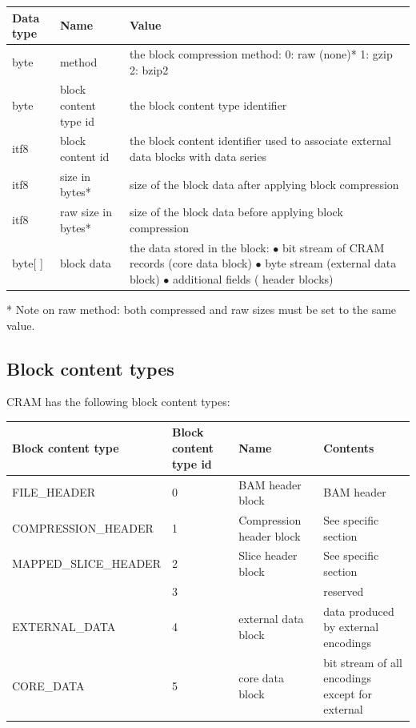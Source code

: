 \documentclass[a4paper]{article}
\begin{document}
\begin{tabular}{|l|>{\raggedright}p{120pt}|>{\raggedright}p{260pt}|}
\hline
\textbf{Data type} & \textbf{Name} & \textbf{Value}
\tabularnewline
\hline
byte & method & the block compression method: \linebreak{}
0: raw (none)*\linebreak{}
1: gzip\linebreak{}
2: bzip2\tabularnewline
\hline
byte & block content type id & the block content type identifier\tabularnewline
\hline
itf8 & block content id & the block content identifier used to associate external 
data blocks with data series\tabularnewline
\hline
itf8 & size in bytes* & size of the block data after applying block compression\tabularnewline
\hline
itf8 & raw size in bytes* & size of the block data before applying block compression\tabularnewline
\hline
byte[ ] & block data & the data stored in the block:\linebreak{}
$\bullet$ bit stream of CRAM records (core data block)\linebreak{}
$\bullet$ byte stream (external data block)\linebreak{}
$\bullet$ additional fields ( header blocks)\tabularnewline
\hline
\end{tabular}

* Note on raw method: both compressed and raw sizes must be set to the same value.

\subsection{\textbf{Block content types}}

CRAM has the following block content types:

\begin{tabular}{|>{\raggedright}p{143pt}|>{\raggedright}p{45pt}|>{\raggedright}p{116pt}|>{\raggedright}p{114pt}|}
\hline
\textbf{Block content type} & \textbf{Block content type id} & \textbf{Name} & \textbf{Contents}\tabularnewline
\hline
FILE\_HEADER & 0 & BAM header block & BAM header\tabularnewline
\hline
COMPRESSION\_HEADER & 1 & Compression header block & See specific section\tabularnewline
\hline
MAPPED\_SLICE\_HEADER & 2 & Slice header block & See specific section\tabularnewline
\hline
 & 3 &  & reserved\tabularnewline
\hline
EXTERNAL\_DATA & 4 & external data block & data produced by external encodings\tabularnewline
\hline
CORE\_DATA & 5 & core data block & bit stream of all encodings except for external\tabularnewline
\hline
\end{tabular}
\end{document}
